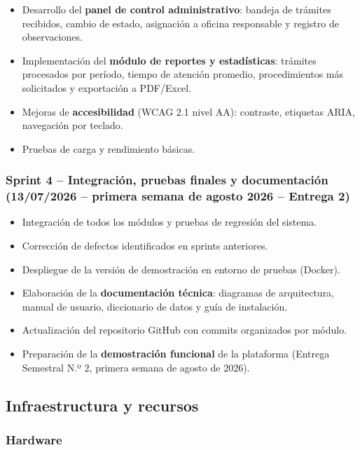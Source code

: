 \begin{itemize}
  \item Desarrollo del \textbf{panel de control administrativo}: bandeja de
    trámites recibidos, cambio de estado, asignación a oficina responsable y
    registro de observaciones.
  \item Implementación del \textbf{módulo de reportes y estadísticas}: trámites
    procesados por período, tiempo de atención promedio, procedimientos más
    solicitados y exportación a PDF/Excel.
  \item Mejoras de \textbf{accesibilidad} (WCAG 2.1 nivel AA): contraste,
    etiquetas ARIA, navegación por teclado.
  \item Pruebas de carga y rendimiento básicas.
\end{itemize}

\subsubsection{Sprint 4 -- Integración, pruebas finales y documentación
(13/07/2026 -- primera semana de agosto 2026 -- Entrega 2)}

\begin{itemize}
  \item Integración de todos los módulos y pruebas de regresión del sistema.
  \item Corrección de defectos identificados en sprints anteriores.
  \item Despliegue de la versión de demostración en entorno de pruebas (Docker).
  \item Elaboración de la \textbf{documentación técnica}: diagramas de
    arquitectura, manual de usuario, diccionario de datos y guía de instalación.
  \item Actualización del repositorio GitHub con commits organizados por módulo.
  \item Preparación de la \textbf{demostración funcional} de la plataforma
    (Entrega Semestral N.º 2, primera semana de agosto de 2026).
\end{itemize}

\subsection{Infraestructura y recursos}

\subsubsection{Hardware}

